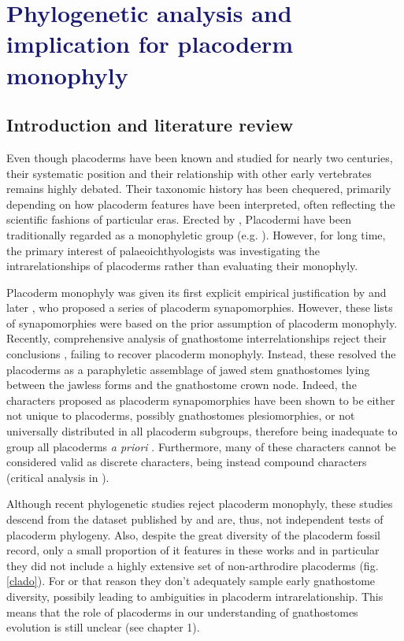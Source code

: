 \documentclass[11pt,letterpaper]{report}
\begin{document}
\newpage
\chapter{\LARGE{\textcolor{MidnightBlue}{Phylogenetic analysis and implication for placoderm monophyly}}}

\section{Introduction and literature review}
Even though placoderms have been known and studied for nearly two centuries, their systematic position and their relationship with other early vertebrates remains highly debated. Their taxonomic history has been chequered, primarily depending on how placoderm features have been interpreted, often reflecting the scientific fashions of particular eras. Erected by \cite{MCoy1848}, Placodermi have been traditionally regarded as a monophyletic group (e.g. \citealt{Stensi1969,Moy-Thomas1971,Denison1975,Denison1978,Miles1977,Jarvik1980,Goujet1982,Goujet1984b,Goujet2001,Young1986,Janvier1996}). However, for long time, the primary interest of palaeoichthyologists was investigating the intrarelationships of placoderms rather than evaluating their monophyly. 

Placoderm monophyly was given its first explicit empirical justification by \cite{Goujet1982,Goujet1984b,Goujet2001} and later \cite{Young1986,Young2008a,Young2009,Young2010}, who proposed a series of placoderm synapomorphies. However, these lists of synapomorphies were based on the prior assumption of placoderm monophyly. Recently, comprehensive analysis of gnathostome interrelationships reject their conclusions \citep{brazeau2009braincase,davis2012,zhu2013silurian,Dupret2014,long2015copulation,giles2015osteichthyan}, failing to recover placoderm monophyly. Instead, these resolved the placoderms as a paraphyletic assemblage of jawed stem gnathostomes lying between the jawless forms and the gnathostome crown node. Indeed, the characters proposed as placoderm synapomorphies have been shown to be either not unique to placoderms, possibly gnathostomes plesiomorphies, or not universally distributed in all placoderm subgroups, therefore being inadequate to group all placoderms \textit{a priori} \citep{brazeau2014characters}. Furthermore, many of these characters cannot be considered valid as discrete characters, being instead compound characters (critical analysis in \citealt{brazeau2014characters}). 

Although recent phylogenetic studies reject placoderm monophyly, these studies descend from the dataset published by \cite{brazeau2009braincase} and are, thus, not independent tests of placoderm phylogeny. Also, despite the great diversity of the placoderm fossil record, only a small proportion of it features in these works and in particular they did not include a highly extensive set of non-arthrodire placoderms (fig. \ref{clado}). For or that reason they don't adequately sample early gnathostome diversity, possibily leading to ambiguities in placoderm intrarelationship. This means that the role of placoderms in our understanding of gnathostomes evolution is still unclear (see chapter 1). 
\end{document}
